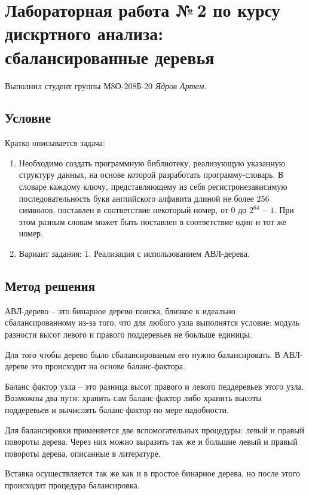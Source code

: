 \documentclass[12pt]{article}
\begin{document}
	
	\section*{Лабораторная работа №\,2 по курсу дискртного анализа: сбалансированные деревья}
	
	Выполнил студент группы М8О-208Б-20 \textit{Ядров Артем}.
	
	\subsection*{Условие}
	
	Кратко описывается задача: 
	\begin{enumerate}
		\item Необходимо создать программную библиотеку, реализующую указанную структуру данных, на основе которой разработать программу-словарь. В словаре каждому ключу, представляющему из себя регистронезависимую последовательность букв английского алфавита длиной не более $256$ символов, поставлен в соответствие некоторый номер, от $0$ до $2^{64} - 1$. При этом разным словам может быть поставлен в соответствие один и тот же номер.
		\item Вариант задания: 1. Реализация с использованием АВЛ-дерева.
	\end{enumerate}
	
	\subsection*{Метод решения}
	
	АВЛ-дерево -- это бинарное дерево поиска, близкое к идеально сбалансированному из-за того, что для любого узла выполнятся условие: модуль разности высот левого и правого поддеревьев не боьльше единицы. 
	
	Для того чтобы дерево было сбалансированым его нужно балансировать. В АВЛ-дереве это происходит на основе баланс-фактора. 
	
	Баланс фактор узла -- это разница высот правого и левого педдеревьев этого узла. Возможны два пути: хранить сам баланс-фактор либо хранить высоты поддеревьев и вычислять баланс-фактор по мере надобности.
	
	Для балансировки применяется две вспомогательных процедуры: левый и правый повороты дерева. Через них можно выразить так же и большие левый и правый повороты дерева, описанные в литературе.
	
	Вставка осуществляется так же как и в простое бинарное дерева, но после этого происходит процедура балансировка. 
	
\end{document}
